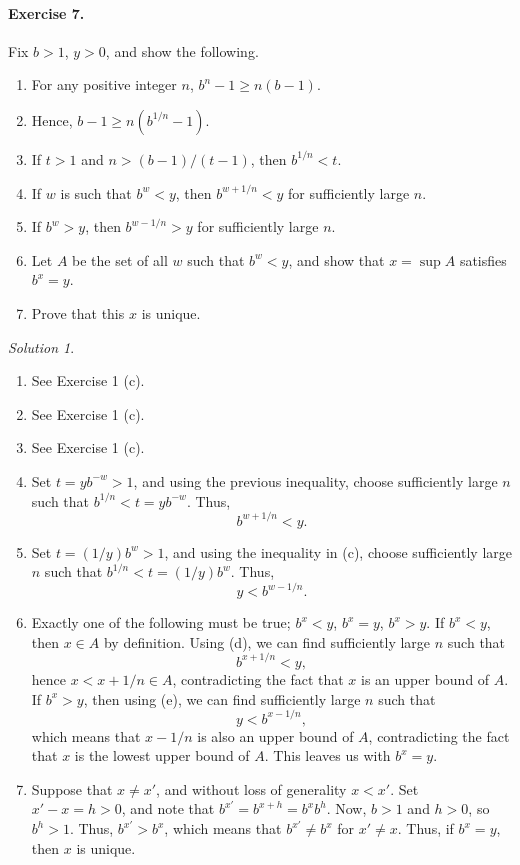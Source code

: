 \documentclass[11pt]{report}
\theoremstyle{remark}
\newtheorem*{solution}{Solution}
\begin{document}
    \paragraph{Exercise 7.} Fix $b > 1$, $y > 0$, and show the following.
    \begin{enumerate}
        \itemsep0em
        \item For any positive integer $n$, $b^n - 1 \geq n(b - 1)$.
        \item Hence, $b - 1 \geq n(b^{1 / n} - 1)$.
        \item If $t > 1$ and $n > (b - 1)/(t - 1)$, then $b^{1 / n} < t$.
        \item If $w$ is such that $b^w < y$, then $b^{w + 1 / n} < y$ for
        sufficiently large $n$.
        \item If $b^w > y$, then $b^{w - 1 / n} > y$ for sufficiently large $n$.
        \item Let $A$ be the set of all $w$ such that $b^w < y$, and show that $x =
        \sup A$ satisfies $b^x = y$.
        \item Prove that this $x$ is unique.
    \end{enumerate}
    \begin{solution} \mbox{}
        \begin{enumerate}
            \item See Exercise 1 (c).
            \item See Exercise 1 (c).
            \item See Exercise 1 (c).
            \item Set $t = yb^{-w} > 1$, and using the previous inequality, choose
            sufficiently large $n$ such that $b^{1 / n} < t = yb^{-w}$. Thus, \[
                b^{w + 1 / n} < y.        
            \]
            \item Set $t = (1 / y)b^{w} > 1$, and using the inequality in (c),
            choose sufficiently large $n$ such that $b^{1 / n} < t = (1 / y)b^w$.
            Thus, \[
                y < b^{w - 1 / n}.
            \] 
            \item Exactly one of the following must be true; $b^x < y$, $b^x = y$,
            $b^x > y$. If $b^x < y$, then $x \in A$ by definition. Using (d), we can
            find sufficiently large $n$ such that \[
                b^{x + 1 / n} < y,
            \] hence $x < x + 1 / n \in A$, contradicting the fact that $x$ is an
            upper bound of $A$. If $b^x > y$, then using (e), we can find
            sufficiently large $n$ such that \[
                y < b^{x - 1 / n},
            \] which means that $x - 1 / n$ is also an upper bound of $A$,
            contradicting the fact that $x$ is the lowest upper bound of $A$.
            This leaves us with $b^x = y$.
            \item Suppose that $x \neq x'$, and without loss of generality $x < x'$.
            Set $x' - x = h > 0$, and note that $b^{x'} = b^{x + h} = b^x b^h$.
            Now, $b > 1$ and $h > 0$, so $b^h > 1$. Thus, $b^{x'} > b^x$, which
            means that $b^{x'} \neq b^x$ for $x' \neq x$. Thus, if $b^x = y$, then
            $x$ is unique.
        \end{enumerate}
    \end{solution}
\end{document}
